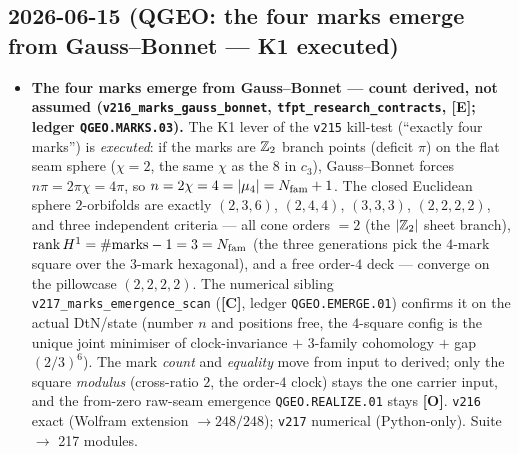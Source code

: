 \documentclass[11pt]{article}
\providecommand{\mE}{\textbf{[E]}}\providecommand{\mC}{\textbf{[C]}}
\providecommand{\mO}{\textbf{[O]}}\providecommand{\mX}{\textbf{[X]}}
\begin{document}
\subsection*{2026-06-15 (QGEO: the four marks emerge from Gauss--Bonnet --- K1 executed)}
\begin{itemize}
\item \textbf{The four marks emerge from Gauss--Bonnet --- count derived, not assumed
  (\texttt{v216\_marks\_gauss\_bonnet}, \texttt{tfpt\_research\_contracts}, \mE; ledger \texttt{QGEO.MARKS.03}).}
  The K1 lever of the \texttt{v215} kill-test (``exactly four marks'') is
  \emph{executed}: if the marks are $\mathbb{Z}_2$ branch points (deficit $\pi$) on the flat seam sphere ($\chi=2$,
  the same $\chi$ as the $8$ in $c_3$), Gauss--Bonnet forces $n\pi=2\pi\chi=4\pi$, so
  $n=2\chi=4=|\mu_4|=N_{\mathrm{fam}}+1$. The closed Euclidean sphere $2$-orbifolds are exactly
  $(2,3,6)$, $(2,4,4)$, $(3,3,3)$, $(2,2,2,2)$, and three independent criteria --- all cone orders $=2$ (the $|\mathbb{Z}_2|$
  sheet branch), $\mathrm{rank}\,H^1=\#\text{marks}-1=3=N_{\mathrm{fam}}$ (the three generations pick the $4$-mark square
  over the $3$-mark hexagonal), and a free order-$4$ deck --- converge on the pillowcase $(2,2,2,2)$. The
  numerical sibling \texttt{v217\_marks\_emergence\_scan} (\mC, ledger \texttt{QGEO.EMERGE.01}) confirms it on
  the actual DtN/state (number $n$ and positions free, the $4$-square config is the unique joint minimiser of
  clock-invariance $+$ $3$-family cohomology $+$ gap $(2/3)^6$). The mark \emph{count} and \emph{equality}
  move from input to derived; only the square
  \emph{modulus} (cross-ratio $2$, the order-$4$ clock) stays the one carrier input, and the from-zero
  raw-seam emergence \texttt{QGEO.REALIZE.01} stays \mO. \texttt{v216} exact (Wolfram extension
  $\to248/248$); \texttt{v217} numerical (Python-only). Suite $\to$ 217 modules.
\end{itemize}
\end{document}
